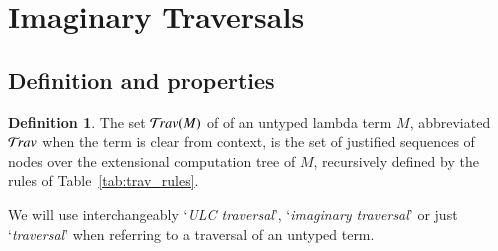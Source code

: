 \documentclass{elsarticle}
\theoremstyle{plain}
\theoremstyle{definition}
\newtheorem{definition}{Definition}[section]
\theoremstyle{remark}
\newcommand{\travulc}{\travset}
\begin{document}
\section{Imaginary Traversals}
\label{sec:imaginary_traversals}
\subsection{Definition and properties}

\begin{definition}
The set $\travulc(M)$ of  of an untyped lambda term $M$, abbreviated $\travulc$ when the term is clear from context, is the set of justified sequences of nodes over the extensional computation tree of $M$, recursively defined by the rules of Table~\ref{tab:trav_rules}.

We will use interchangeably `\emph{ULC traversal}', `\emph{imaginary traversal}' or just `\emph{traversal}' when referring to a traversal of an untyped term.
\end{definition}
\end{document}
